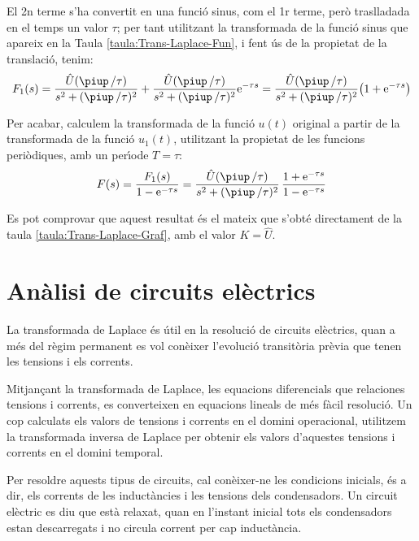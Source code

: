 \begin{exemple}
El 2n terme s'ha convertit en una funci\'{o} sinus, com el 1r terme,
per\`{o} traslladada en el temps un valor $\tau$; per tant utilitzant la
transformada de la funci\'{o} sinus que apareix en la Taula
\vref{taula:Trans-Laplace-Fun}, i fent \'{u}s de la propietat de la
translaci\'{o}, tenim:
\[
    F_1(s) = \frac{\hat{U} (\piup\,/\tau)}{s^2 + (\piup\,/\tau)^2} +
    \frac{\hat{U} (\piup\,/\tau)}{s^2 + (\piup\,/\tau)^2} \eu^{-\tau s} =
    \frac{\hat{U} (\piup\,/\tau)}{s^2 + (\piup\,/\tau)^2} \bigl( 1+\eu^{-\tau s}
    \big)
\]

Per acabar, calculem la transformada de la funci\'{o} $u(t)$ original a
partir de la transformada de la funci\'{o} $u_1(t)$, utilitzant la
propietat de les funcions peri\`{o}diques, amb un per\'{\i}ode $T=\tau$:
\[
    F(s) = \frac{F_1(s)}{1-\eu^{-\tau s}} =
    \frac{\hat{U} (\piup\,/\tau) }{s^2 + (\piup\,/\tau)^2}\,\frac{1+\eu^{-\tau s}}{1-\eu^{-\tau
    s}}
\]

Es pot comprovar que aquest resultat \'{e}s el mateix que s'obt\'{e} directament de la taula \vref{taula:Trans-Laplace-Graf}, amb el valor $K=\hat{U}$.
\end{exemple}

\section{An\`{a}lisi de circuits el\`{e}ctrics}

La transformada de Laplace \'{e}s \'{u}til en la resoluci\'{o} de circuits
el\`{e}ctrics, quan a m\'{e}s del r\`{e}gim permanent es vol con\`{e}ixer
l'evoluci\'{o} transit\`{o}ria pr\`{e}via que tenen les tensions i els corrents.

Mitjan\c{c}ant la transformada de Laplace, les equacions diferencials
que relaciones tensions i corrents, es converteixen en equacions
lineals de m\'{e}s f\`{a}cil resoluci\'{o}. Un cop calculats els valors de
tensions i corrents en el domini operacional, utilitzem la
transformada inversa de Laplace per obtenir els valors d'aquestes
tensions i corrents en el domini temporal.

Per resoldre aquests tipus de circuits, cal con\`{e}ixer-ne les
condicions inicials, \'{e}s a dir, els corrents de les induct\`{a}ncies i
les tensions dels condensadors. Un circuit el\`{e}ctric es diu que est\`{a}
relaxat, quan en l'instant inicial tots els condensadors estan
descarregats i no circula corrent per cap induct\`{a}ncia.

